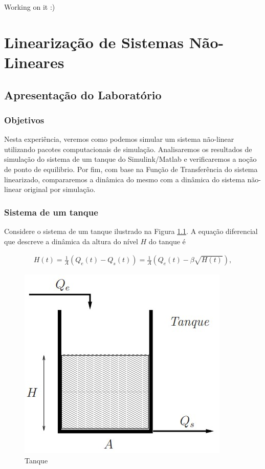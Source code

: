 \documentclass[
]{book}
\begin{document}
Working on it :)

\hypertarget{linearizauxe7uxe3o-de-sistemas-nuxe3o-lineares}{%
\chapter{Linearização de Sistemas Não-Lineares}\label{linearizauxe7uxe3o-de-sistemas-nuxe3o-lineares}}

\hypertarget{apresentauxe7uxe3o-do-laboratuxf3rio}{%
\section{Apresentação do Laboratório}\label{apresentauxe7uxe3o-do-laboratuxf3rio}}

\hypertarget{objetivos}{%
\subsection{Objetivos}\label{objetivos}}

Nesta experiência, veremos como podemos simular um sistema não-linear utilizando pacotes computacionais de simulação. Analisaremos os resultados de simulação do sistema de um tanque do Simulink/Matlab e verificaremos a noção de ponto de equilibrio. Por fim, com base na Função de Transferência do sistema linearizado, compararemos a dinâmica do mesmo com a dinâmica do sistema não-linear original por simulação.

\hypertarget{sistema-de-um-tanque}{%
\subsection{Sistema de um tanque}\label{sistema-de-um-tanque}}

Considere o sistema de um tanque ilustrado na Figura \ref{fig:fig61}. A equação diferencial que descreve a dinâmica da altura do nível \(H\) do tanque é

\begin{align}
H(t) = \frac{1}{A}(Q_e(t)-Q_s(t)) = \boxed{\frac{1}{A}(Q_e(t)-\beta\sqrt{H(t)})}, \label{eq:eq61}
\end{align}

\begin{figure}

{\centering \includegraphics[width=0.5\linewidth]{Imagens/Lab6/Apresentação/fig1} 

}

\caption{Tanque}\label{fig:fig61}
\end{figure}
\end{document}
